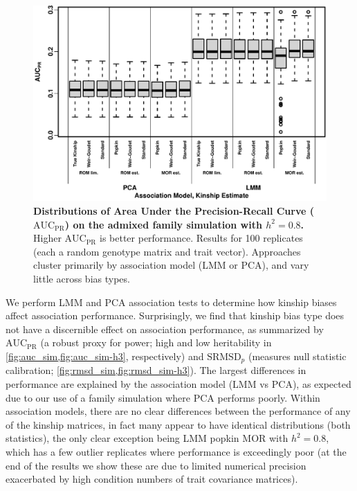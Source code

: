 \documentclass[11pt]{article}
\newcommand{\rmsd}{\text{SRMSD}_p}
\newcommand{\auc}{\text{AUC}_\text{PR}}
\begin{document}
\begin{linenumbers}
\begin{figure}[bp!]
  \centering
  \includegraphics[width=\textwidth]{sim-admix-n1000-m100000-k3-f0.3-s0.5-mc100-h0.8-g20-fes/auc.pdf}
  \caption{
    {\bf Distributions of Area Under the Precision-Recall Curve ($\auc$) on the admixed family simulation with $h^2=0.8$.}
    Higher $\auc$ is better performance.
    Results for 100 replicates (each a random genotype matrix and trait vector).
    Approaches cluster primarily by association model (LMM or PCA), and vary little across bias types.
  }
  \label{fig:auc_sim}
\end{figure}

We perform LMM and PCA association tests to determine how kinship biases affect association performance.
Surprisingly, we find that kinship bias type does not have a discernible effect on association performance, as summarized by $\auc$ (a robust proxy for power; high and low heritability in \cref{fig:auc_sim,fig:auc_sim-h3}, respectively) and $\rmsd$ (measures null statistic calibration; \cref{fig:rmsd_sim,fig:rmsd_sim-h3}).
The largest differences in performance are explained by the association model (LMM vs PCA), as expected due to our use of a family simulation where PCA performs poorly.
Within association models, there are no clear differences between the performance of any of the kinship matrices, in fact many appear to have identical distributions (both statistics), the only clear exception being LMM popkin MOR with $h^2=0.8$, which has a few outlier replicates where performance is exceedingly poor (at the end of the results we show these are due to limited numerical precision exacerbated by high condition numbers of trait covariance matrices).


\end{linenumbers}
\end{document}
